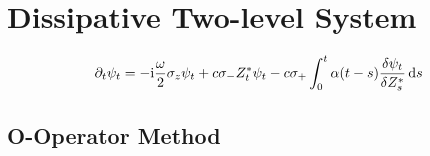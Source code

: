 \section{Dissipative Two-level System}
\label{sec:nmqsd.two_level}

\begin{equation}
  \partial_t \psi_t = -\mathrm{i}\frac{\omega}{2}\sigma_z\psi_t + c \sigma_- {Z}^*_t \psi_t - c\sigma_+ \int_0^t \alpha(t - s) \frac{\delta\psi_t}{\delta {Z}^*_s} \, \mathrm{d} s
  \label{eq:nmqsd.nmsse_twolevel}
\end{equation}

\subsection{O-Operator Method}
\label{sub:nmqsd.two_level.o}
%

